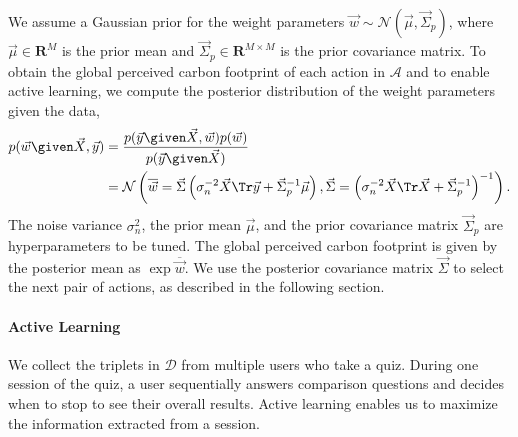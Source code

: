 We assume a Gaussian prior for the weight parameters $\vec{w} \sim \mathcal{N}(\vec{\mu}, \vec{\Sigma}_p)$, where $\vec{\mu} \in \mathbf{R}^M $ is the prior mean and $\vec{\Sigma}_p \in \mathbf{R}^{M \times M}$ is the prior covariance matrix.
To obtain the global perceived carbon footprint of each action in $\mathcal{A}$ and to enable active learning, we compute the posterior distribution of the weight parameters given the data,
\begin{align}
	\label{clm:eq:posterior}
	p(\vec{w} \given \vec{X}, \vec{y})
	 & = \frac{p(\vec{y} \given \vec{X}, \vec{w})p(\vec{w})}{p(\vec{y} \given \vec{X})} \nonumber                                                                                                                                             \\
	 & = \mathcal{N}\left(\overline{\vec{w}} = \vec{\Sigma} \left( \sigma_n^{-2} \vec{X}\Tr \vec{y} + \vec{\Sigma}_p^{-1} \vec{\mu}\right), \vec{\Sigma} = \left( \sigma_n^{-2} \vec{X}\Tr \vec{X} + \vec{\Sigma}_p^{-1} \right)^{-1}\right).
\end{align}
The noise variance $\sigma_n^2$, the prior mean $\vec{\mu}$, and the prior covariance matrix $\vec{\Sigma}_p$ are hyperparameters to be tuned.
The global perceived carbon footprint is given by the posterior mean as $\exp \overline{\vec{w}}$.
We use the posterior covariance matrix $\vec{\Sigma}$ to select the next pair of actions, as described in the following section.


\paragraph{Active Learning}
We collect the triplets in $\mathcal{D}$ from multiple users who take a quiz.
During one session of the quiz, a user sequentially answers comparison questions and decides when to stop to see their overall results.
Active learning enables us to maximize the information extracted from a session.

